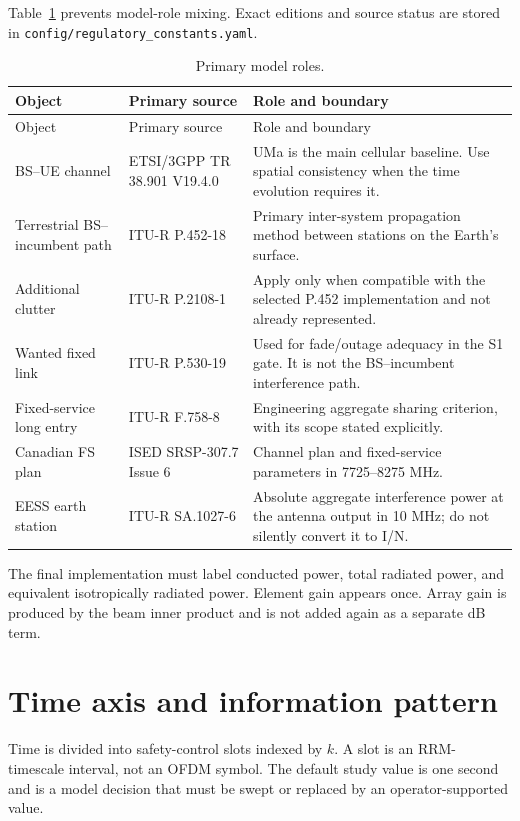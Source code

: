 \documentclass[11pt]{article}
\begin{document}
Table~\ref{tab:models} prevents model-role mixing. Exact editions and source status are stored in \texttt{config/regulatory\_constants.yaml}.

\begin{longtable}{p{}p{}p{}}
\caption{Primary model roles.}\label{tab:models}\\
\toprule
Object & Primary source & Role and boundary\\
\midrule
\endfirsthead
\toprule
Object & Primary source & Role and boundary\\
\midrule
\endhead
BS--UE channel & ETSI/3GPP TR 38.901 V19.4.0 & UMa is the main cellular baseline. Use spatial consistency when the time evolution requires it.\\
Terrestrial BS--incumbent path & ITU-R P.452-18 & Primary inter-system propagation method between stations on the Earth's surface.\\
Additional clutter & ITU-R P.2108-1 & Apply only when compatible with the selected P.452 implementation and not already represented.\\
Wanted fixed link & ITU-R P.530-19 & Used for fade/outage adequacy in the S1 gate. It is not the BS--incumbent interference path.\\
Fixed-service long entry & ITU-R F.758-8 & Engineering aggregate sharing criterion, with its scope stated explicitly.\\
Canadian FS plan & ISED SRSP-307.7 Issue 6 & Channel plan and fixed-service parameters in 7725--8275 MHz.\\
EESS earth station & ITU-R SA.1027-6 & Absolute aggregate interference power at the antenna output in 10 MHz; do not silently convert it to I/N.\\
\bottomrule
\end{longtable}

The final implementation must label conducted power, total radiated power, and equivalent isotropically radiated power. Element gain appears once. Array gain is produced by the beam inner product and is not added again as a separate dB term.

\section{Time axis and information pattern}

Time is divided into safety-control slots indexed by $k$. A slot is an RRM-timescale interval, not an OFDM symbol. The default study value is one second and is a model decision that must be swept or replaced by an operator-supported value.
\end{document}
